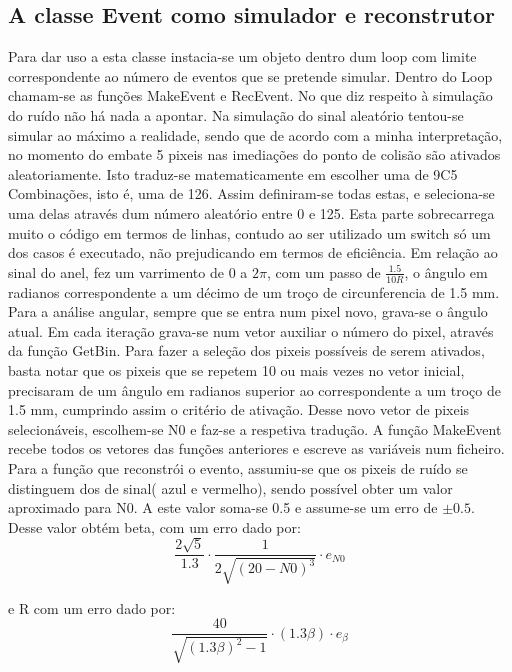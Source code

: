 \documentclass{article}
\begin{document}
\begin{multicols}{2}
\subsection{A classe Event como simulador e reconstrutor}
	Para dar uso a esta classe instacia-se um objeto dentro dum loop com limite correspondente ao número de eventos que se pretende simular. Dentro do Loop chamam-se as funções MakeEvent e RecEvent.
	No que diz respeito à simulação do ruído não há nada a apontar. 
	Na simulação do sinal aleatório tentou-se simular ao máximo a realidade, sendo que de acordo com a minha interpretação, no momento do embate 5 pixeis nas imediações do ponto de colisão são ativados aleatoriamente. Isto traduz-se matematicamente em escolher uma de 9C5 Combinações, isto é, uma de 126. Assim definiram-se todas estas, e seleciona-se uma delas através dum número aleatório entre 0 e 125. Esta parte sobrecarrega muito o código em termos de linhas, contudo ao ser utilizado um switch só um dos casos é executado, não prejudicando em termos de eficiência.
Em relação ao sinal do anel, fez um varrimento de 0 a $2\pi$, com um passo de $\frac{1.5}{10R}$, o ângulo em radianos correspondente a um décimo de um troço de circunferencia de 1.5 mm. Para a análise angular, sempre que se entra num pixel novo, grava-se o ângulo atual. Em cada iteração grava-se num vetor auxiliar o número do pixel, através da função GetBin. Para fazer a seleção dos pixeis possíveis de serem ativados, basta notar que os pixeis que se repetem 10 ou mais vezes no vetor inicial, precisaram de um ângulo em radianos superior ao correspondente a um troço de 1.5 mm, cumprindo assim o critério de ativação. Desse novo vetor de pixeis selecionáveis, escolhem-se N0 e faz-se a respetiva tradução. 
A função MakeEvent recebe todos os vetores das funções anteriores e escreve as variáveis num ficheiro.
Para a função que reconstrói o evento, assumiu-se que os pixeis de ruído se distinguem dos de sinal( azul e vermelho), sendo possível obter um valor aproximado para N0. A este valor soma-se 0.5 e assume-se um erro de $\pm 0.5$. 
Desse valor obtém beta, com um erro dado por:
\begin{equation}
\frac{2\sqrt{5}}{1.3}\cdot \frac{1}{2 \sqrt{{(20-N0)}^3}} \cdot e_{N0}
\end{equation}

e R com um erro dado por:
\begin{equation}
\frac{40}{\sqrt{(1.3\beta)^2-1}} \cdot (1.3\beta) \cdot e_{\beta}
\end{equation}


\end{multicols}
\end{document}
